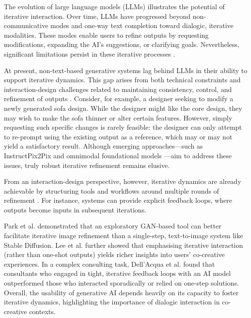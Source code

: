 The evolution of large language models (LLMs) illustrates the potential of iterative interaction. Over time, LLMs have progressed beyond non-communicative modes and one-way text completion toward dialogic, iterative modalities. These modes enable users to refine outputs by requesting modifications, expanding the AI's suggestions, or clarifying goals. Nevertheless, significant limitations persist in these iterative processes \cite{Bown2024-yx, Ocampo2024-dv}.

At present, non-text-based generative systems lag behind LLMs in their ability to support iterative dynamics. This gap arises from both technical constraints and interaction-design challenges related to maintaining consistency, control, and refinement of outputs \cite{Ocampo2024-dv}. Consider, for example, a designer seeking to modify a newly generated sofa design. While the designer might like the core design, they may wish to make the sofa thinner or alter certain features. However, simply requesting such specific changes is rarely feasible: the designer can only attempt to re-prompt using the existing output as a reference, which may or may not yield a satisfactory result. Although emerging approaches—such as InstructPix2Pix \cite{Brooks2022-vo} and omnimodal foundational models \cite{Pichai2024-ao}—aim to address these issues, truly robust iterative refinement remains elusive.

From an interaction-design perspective, however, iterative dynamics are already achievable by structuring tools and workflows around multiple rounds of refinement \cite{Koch2020-gx, Lee2022-rj, Kim2023-wt}. For instance, systems can provide explicit feedback loops, where outputs become inputs in subsequent iterations.

Park et al. \cite{Park2024-gw} demonstrated that an exploratory GAN-based tool can better facilitate iterative image refinement than a single-step, text-to-image system like Stable Diffusion. Lee et al. \cite{Lee2022-rj} further showed that emphasising iterative interaction (rather than one-shot outputs) yields richer insights into users' co-creative experiences. In a complex consulting task, Dell'Acqua et al. \cite{DellAcqua2023-og} found that consultants who engaged in tight, iterative feedback loops with an AI model outperformed those who interacted sporadically or relied on one-step solutions. Overall, the usability of generative AI depends heavily on its capacity to foster iterative dynamics, highlighting the importance of dialogic interaction in co-creative contexts.

